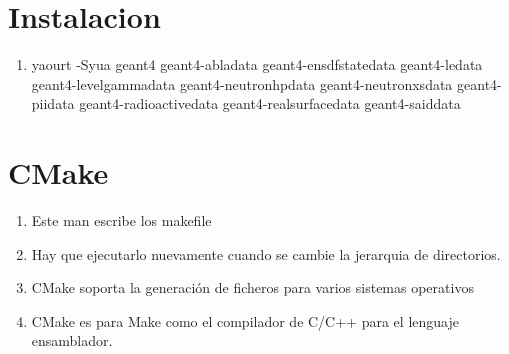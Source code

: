 \documentclass[10pt,a4paper,oneside]{book}
\begin{document}
\section*{Instalacion}
\begin{enumerate}
\item yaourt -Syua geant4 geant4-abladata geant4-ensdfstatedata geant4-ledata
  geant4-levelgammadata geant4-neutronhpdata geant4-neutronxsdata
  geant4-piidata geant4-radioactivedata geant4-realsurfacedata
  geant4-saiddata
\end{enumerate}


\section*{CMake}
\begin{enumerate}
\item Este man escribe los makefile
\item Hay que ejecutarlo nuevamente cuando se cambie la jerarquia de
  directorios.
\item CMake soporta la generación de ficheros para varios sistemas
  operativos
\item CMake es para Make como el compilador de C/C++ para el lenguaje
  ensamblador.
\end{enumerate}
\end{document}
